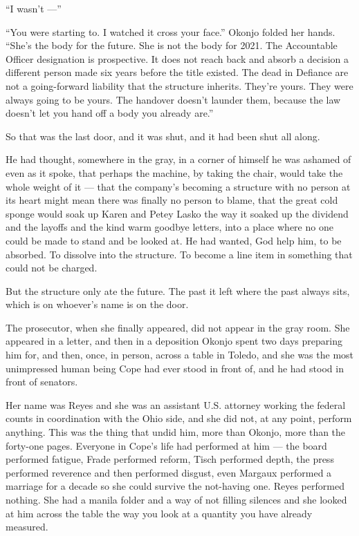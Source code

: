 \documentclass[11pt,openany]{book}
\newcommand{\scenebreak}{\par\vspace{0.5\baselineskip}\begin{center}\textasteriskcentered\quad\textasteriskcentered\quad\textasteriskcentered\end{center}\vspace{0.5\baselineskip}\par}
\begin{document}
``I wasn't ---''

``You were starting to. I watched it cross your face.'' Okonjo folded her hands. ``She's the body for the future. She is not the body for 2021. The Accountable Officer designation is prospective. It does not reach back and absorb a decision a different person made six years before the title existed. The dead in Defiance are not a going-forward liability that the structure inherits. They're yours. They were always going to be yours. The handover doesn't launder them, because the law doesn't let you hand off a body you already are.''

So that was the last door, and it was shut, and it had been shut all along.

He had thought, somewhere in the gray, in a corner of himself he was ashamed of even as it spoke, that perhaps the machine, by taking the chair, would take the whole weight of it --- that the company's becoming a structure with no person at its heart might mean there was finally no person to blame, that the great cold sponge would soak up Karen and Petey Lasko the way it soaked up the dividend and the layoffs and the kind warm goodbye letters, into a place where no one could be made to stand and be looked at. He had wanted, God help him, to be absorbed. To dissolve into the structure. To become a line item in something that could not be charged.

But the structure only ate the future. The past it left where the past always sits, which is on whoever's name is on the door.


\scenebreak


The prosecutor, when she finally appeared, did not appear in the gray room. She appeared in a letter, and then in a deposition Okonjo spent two days preparing him for, and then, once, in person, across a table in Toledo, and she was the most unimpressed human being Cope had ever stood in front of, and he had stood in front of senators.

Her name was Reyes and she was an assistant U.S. attorney working the federal counts in coordination with the Ohio side, and she did not, at any point, perform anything. This was the thing that undid him, more than Okonjo, more than the forty-one pages. Everyone in Cope's life had performed at him --- the board performed fatigue, Frade performed reform, Tisch performed depth, the press performed reverence and then performed disgust, even Margaux performed a marriage for a decade so she could survive the not-having one. Reyes performed nothing. She had a manila folder and a way of not filling silences and she looked at him across the table the way you look at a quantity you have already measured.
\end{document}
